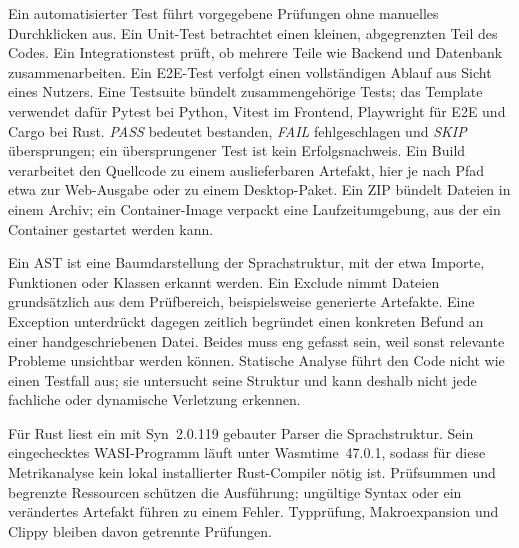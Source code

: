 \begin{beginnerstatement}

Ein automatisierter Test führt vorgegebene Prüfungen ohne manuelles
Durchklicken aus. Ein Unit-Test betrachtet einen kleinen, abgegrenzten Teil des
Codes. Ein Integrationstest prüft, ob mehrere Teile wie Backend und Datenbank
zusammenarbeiten. Ein E2E-Test verfolgt einen vollständigen Ablauf aus Sicht
eines Nutzers. Eine Testsuite bündelt zusammengehörige Tests; das Template
verwendet dafür Pytest bei Python, Vitest im Frontend, Playwright für E2E und
Cargo bei Rust. \emph{PASS} bedeutet bestanden, \emph{FAIL} fehlgeschlagen und
\emph{SKIP} übersprungen; ein übersprungener Test ist kein Erfolgsnachweis. Ein
Build verarbeitet den Quellcode zu einem auslieferbaren Artefakt, hier je nach
Pfad etwa zur Web-Ausgabe oder zu einem Desktop-Paket. Ein ZIP bündelt Dateien
in einem Archiv; ein Container-Image verpackt eine Laufzeitumgebung, aus der
ein Container gestartet werden kann.

Ein AST ist eine Baumdarstellung der Sprachstruktur, mit der etwa Importe,
Funktionen oder Klassen erkannt werden. Ein Exclude nimmt Dateien grundsätzlich
aus dem Prüfbereich, beispielsweise generierte Artefakte. Eine Exception
unterdrückt dagegen zeitlich begründet einen konkreten Befund an einer
handgeschriebenen Datei. Beides muss eng gefasst sein, weil sonst relevante
Probleme unsichtbar werden können. Statische Analyse führt den Code nicht wie
einen Testfall aus; sie untersucht seine Struktur und kann deshalb nicht jede
fachliche oder dynamische Verletzung erkennen.

Für Rust liest ein mit Syn~2.0.119 gebauter Parser die Sprachstruktur. Sein
eingechecktes WASI-Programm läuft unter Wasmtime~47.0.1, sodass für diese
Metrikanalyse kein lokal installierter Rust-Compiler nötig ist. Prüfsummen und
begrenzte Ressourcen schützen die Ausführung; ungültige Syntax oder ein
verändertes Artefakt führen zu einem Fehler. Typprüfung, Makroexpansion und
Clippy bleiben davon getrennte Prüfungen.

\end{beginnerstatement}
